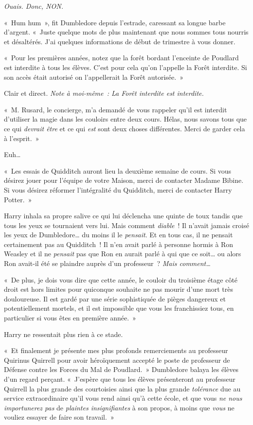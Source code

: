 \emph{Ouais. Donc, NON.}

«~Hum hum~», fit Dumbledore depuis l'estrade, caressant sa longue barbe d'argent.
«~Juste quelque mots de plus maintenant que nous sommes tous nourris et désaltérés.
J'ai quelques informations de début de trimestre à vous donner.

«~Pour les premières années, notez que la forêt bordant l'enceinte de Poudlard est interdite à tous les élèves.
C'est pour cela qu'on l'appelle la Forêt interdite.
Si son accès était autorisé on l'appellerait la Forêt autorisée.~»

Clair et direct. \emph{Note à moi-même~: La Forêt interdite est interdite.}

«~M. Rusard, le concierge, m'a demandé de vous rappeler qu'il est interdit d'utiliser la magie dans les couloirs entre deux cours.
Hélas, nous savons tous que ce qui \emph{devrait être} et ce qui \emph{est} sont deux choses différentes.
Merci de garder cela à l'esprit.~»

Euh…

«~Les essais de Quidditch auront lieu la deuxième semaine de cours.
Si vous désirez jouer pour l'équipe de votre Maison, merci de contacter Madame Bibine.
Si vous désirez réformer l'intégralité du Quidditch, merci de contacter Harry Potter.~»

Harry inhala sa propre salive ce qui lui déclencha une quinte de toux tandis que tous les yeux se tournaient vers lui.
Mais comment \emph{diable}~!
Il n'avait jamais croisé les yeux de Dumbledore… du moins il le \emph{pensait}.
Et en tous cas, il ne pensait certainement pas au Quidditch~!
Il n'en avait parlé à personne hormis à Ron Weasley et il ne \emph{pensait} pas que Ron en aurait parlé à qui que ce soit… ou alors Ron avait-il été se plaindre auprès d'un professeur~?
\emph{Mais comment…}

«~De plus, je dois vous dire que cette année, le couloir du troisième étage côté droit est hors limites pour quiconque souhaite ne pas mourir d'une mort très douloureuse.
Il est gardé par une série sophistiquée de pièges dangereux et potentiellement mortels, et il est impossible que vous les franchissiez tous, en particulier si vous êtes en première année.~»

Harry ne ressentait plus rien à ce stade.

«~Et finalement je présente mes plus profonds remerciements au professeur Quirinus Quirrell pour avoir héroïquement accepté le poste de professeur de Défense contre les Forces du Mal de Poudlard.~»
Dumbledore balaya les élèves d'un regard perçant.
«~J'espère que tous les élèves présenteront au professeur Quirrell la plus grande des courtoisies ainsi que la plus grande \emph{tolérance} due au service extraordinaire qu'il vous rend ainsi qu'à cette école, et que vous \emph{ne nous importunerez pas} de \emph{plaintes insignifiantes} à son propos, à moins que \emph{vous} ne vouliez essayer de faire son travail.~»

